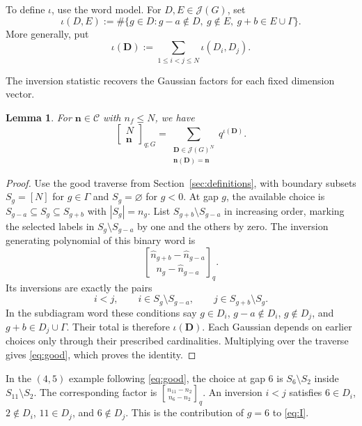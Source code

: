 \documentclass[12pt,reqno]{amsart}
\numberwithin{equation}{section}
\newtheorem{lemma}[theorem]{Lemma}
\theoremstyle{definition}
\theoremstyle{remark}
\theoremstyle{plain}
\newcommand{\nn}{\mathbf n}
\newcommand{\qbin}[2]{\genfrac{[}{]}{0pt}{}{#1}{#2}_{q}}
\newcommand{\mult}[2]{\left[\begin{matrix}#1\\#2\end{matrix}\right]_{q;G}}
\begin{document}
To define $\iota$, use the word model.  For $D,E\in\mathcal J(G)$, set
\begin{equation}\label{eq:I}
 \iota(D,E):=\#\{g\in D:g-a\notin D,\ g\notin E,
                                    \ g+b\in E\cup\Gamma\}.
\end{equation}
More generally, put
\begin{equation}\label{eq:inversionword}
 \iota(\boldsymbol D):=\sum_{1\le i<j\le N}\iota(D_i,D_j).
\end{equation}

The inversion statistic recovers the Gaussian factors for each fixed dimension vector.


\begin{lemma}\label{lem:words}
For $\nn\in\mathcal C$ with $n_f\le N$, we have
\begin{equation}\label{eq:fixedGaussian}
 \mult N\nn=
 \sum_{\substack{\boldsymbol D\in \mathcal{J}(G)^N\\ \nn(\boldsymbol D)=\nn}}
                 q^{\iota(\boldsymbol D)}.
\end{equation}
\end{lemma}
\begin{proof}
Use the good traverse from Section~\ref{sec:definitions}, with boundary
subsets $S_g=[N]$ for $g\in\Gamma$ and $S_g=\varnothing$ for $g<0$.
At gap $g$, the available choice is
$S_{g-a}\subseteq S_g\subseteq S_{g+b}$ with $|S_g|=n_g$.
List $S_{g+b}\setminus S_{g-a}$ in increasing order, marking the selected
labels in $S_g\setminus S_{g-a}$ by one and the others by zero.
The inversion generating polynomial of this binary word is
\[
 \qbin{\widehat n_{g+b}-\widehat n_{g-a}}{n_g-\widehat n_{g-a}}.
\]
Its inversions are exactly the pairs
\[
 i<j,\qquad i\in S_g\setminus S_{g-a},\qquad
 j\in S_{g+b}\setminus S_g.
\]
In the subdiagram word these conditions say
$g\in D_i$, $g-a\notin D_i$, $g\notin D_j$, and
$g+b\in D_j\cup\Gamma$.
Their total is therefore $\iota(\boldsymbol D)$.
Each Gaussian depends on earlier choices only through their prescribed
cardinalities.  Multiplying over the traverse gives \eqref{eq:good},
which proves the identity.
\end{proof}

In the $(4,5)$ example following \eqref{eq:good}, the choice at gap $6$ is
$S_6\setminus S_2$ inside $S_{11}\setminus S_2$.
The corresponding factor is $\qbin{n_{11}-n_2}{n_6-n_2}$.
An inversion $i<j$ satisfies
$6\in D_i$, $2\notin D_i$, $11\in D_j$, and $6\notin D_j$.
This is the contribution of $g=6$ to \eqref{eq:I}.
\end{document}
